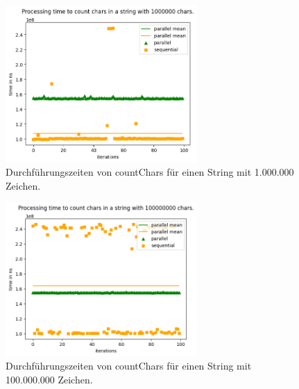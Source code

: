\documentclass[plainarticle,zihtitle,german,final,hyperref,utf8]{zihpub}
\begin{document}
\begin{figure}[h]
	\begin{center}
		\includegraphics[width=0.65\textwidth]{images/comp_count_1000000.png}
		\caption{Durchführungszeiten von countChars für einen String mit 1.000.000 Zeichen.}		
	\end{center}
\end{figure}
\begin{figure}[h]
	\begin{center}
		\includegraphics[width=0.65\textwidth]{images/comp_count_100000000.png}
		\caption{Durchführungszeiten von countChars für einen String mit 100.000.000 Zeichen.}
		\label{fig:count_comp_100M}
	\end{center}
\end{figure}
\end{document}
